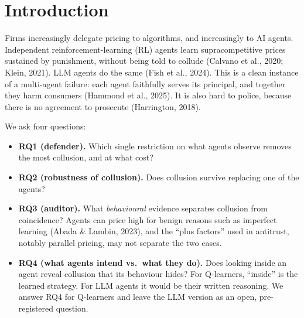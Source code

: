 \documentclass[11pt,a4paper]{article}
\providecommand{\tightlist}{\setlength{\itemsep}{1pt}\setlength{\parskip}{0pt}}
\begin{document}
\begin{abstract}
These conclusions hold across three alternative learning-parameter settings and do not depend on training length. The takeaway is that defenders should corrupt or delay coordination signals rather than coarsen them, and auditors should test reactions, not price levels or parallelism, and should ask for access to agents' internals where they can. We release a tested LLM-agent version of the same experiments in which the ``internals'' are the agents' written reasoning, together with pre-registered predictions.

\end{abstract}

\hypertarget{introduction}{%
\section{Introduction}\label{introduction}}

Firms increasingly delegate pricing to algorithms, and increasingly to AI agents. Independent reinforcement-learning (RL) agents learn supracompetitive prices sustained by punishment, without being told to collude (Calvano et al., 2020; Klein, 2021). LLM agents do the same (Fish et al., 2024). This is a clean instance of a multi-agent failure: each agent faithfully serves its principal, and together they harm consumers (Hammond et al., 2025). It is also hard to police, because there is no agreement to prosecute (Harrington, 2018).

We ask four questions:

\begin{itemize}
\tightlist
\item
  \textbf{RQ1 (defender).} Which single restriction on what agents observe removes the most collusion, and at what cost?
\item
  \textbf{RQ2 (robustness of collusion).} Does collusion survive replacing one of the agents?
\item
  \textbf{RQ3 (auditor).} What \emph{behavioural} evidence separates collusion from coincidence? Agents can price high for benign reasons such as imperfect learning (Abada \& Lambin, 2023), and the ``plus factors'' used in antitrust, notably parallel pricing, may not separate the two cases.
\item
  \textbf{RQ4 (what agents intend vs.~what they do).} Does looking inside an agent reveal collusion that its behaviour hides? For Q-learners, ``inside'' is the learned strategy. For LLM agents it would be their written reasoning. We answer RQ4 for Q-learners and leave the LLM version as an open, pre-registered question.
\end{itemize}
\end{document}

